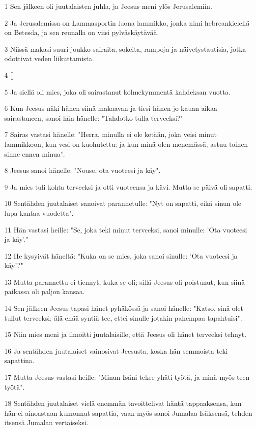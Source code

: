 \par 1 Sen jälkeen oli juutalaisten juhla, ja Jeesus meni ylös Jerusalemiin.
\par 2 Ja Jerusalemissa on Lammasportin luona lammikko, jonka nimi hebreankielellä on Betesda, ja sen reunalla on viisi pylväskäytävää.
\par 3 Niissä makasi suuri joukko sairaita, sokeita, rampoja ja näivetystautisia, jotka odottivat veden liikuttamista.
\par 4 []
\par 5 Ja siellä oli mies, joka oli sairastanut kolmekymmentä kahdeksan vuotta.
\par 6 Kun Jeesus näki hänen siinä makaavan ja tiesi hänen jo kauan aikaa sairastaneen, sanoi hän hänelle: "Tahdotko tulla terveeksi?"
\par 7 Sairas vastasi hänelle: "Herra, minulla ei ole ketään, joka veisi minut lammikkoon, kun vesi on kuohutettu; ja kun minä olen menemässä, astuu toinen sinne ennen minua".
\par 8 Jeesus sanoi hänelle: "Nouse, ota vuoteesi ja käy".
\par 9 Ja mies tuli kohta terveeksi ja otti vuoteensa ja kävi. Mutta se päivä oli sapatti.
\par 10 Sentähden juutalaiset sanoivat parannetulle: "Nyt on sapatti, eikä sinun ole lupa kantaa vuodetta".
\par 11 Hän vastasi heille: "Se, joka teki minut terveeksi, sanoi minulle: 'Ota vuoteesi ja käy'."
\par 12 He kysyivät häneltä: "Kuka on se mies, joka sanoi sinulle: 'Ota vuoteesi ja käy'?"
\par 13 Mutta parannettu ei tiennyt, kuka se oli; sillä Jeesus oli poistunut, kun siinä paikassa oli paljon kansaa.
\par 14 Sen jälkeen Jeesus tapasi hänet pyhäkössä ja sanoi hänelle: "Katso, sinä olet tullut terveeksi; älä enää syntiä tee, ettei sinulle jotakin pahempaa tapahtuisi".
\par 15 Niin mies meni ja ilmoitti juutalaisille, että Jeesus oli hänet terveeksi tehnyt.
\par 16 Ja sentähden juutalaiset vainosivat Jeesusta, koska hän semmoista teki sapattina.
\par 17 Mutta Jeesus vastasi heille: "Minun Isäni tekee yhäti työtä, ja minä myös teen työtä".
\par 18 Sentähden juutalaiset vielä enemmän tavoittelivat häntä tappaaksensa, kun hän ei ainoastaan kumonnut sapattia, vaan myös sanoi Jumalaa Isäksensä, tehden itsensä Jumalan vertaiseksi.
